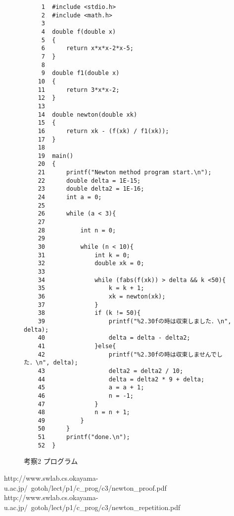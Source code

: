 \documentclass[12pt]{jarticle}
\renewcommand  \[  {\begin{eqnarray}}
\renewcommand  \]  {\end{eqnarray}}
\begin{document}
\begin{figure}[t]
\begin{screen}
\footnotesize
\begin{verbatim}
     1	#include <stdio.h>
     2	#include <math.h> 
     3	
     4	double f(double x)
     5	{
     6	    return x*x*x-2*x-5;
     7	}
     8	
     9	double f1(double x)
    10	{
    11	    return 3*x*x-2;
    12	}
    13	
    14	double newton(double xk)
    15	{
    16	    return xk - (f(xk) / f1(xk));
    17	}
    18	
    19	main()
    20	{
    21	    printf("Newton method program start.\n");
    22	    double delta = 1E-15;
    23	    double delta2 = 1E-16;
    24	    int a = 0;
    25	
    26	    while (a < 3){
    27	
    28	        int n = 0;
    29	
    30	        while (n < 10){
    31	            int k = 0;
    32	            double xk = 0;
    33	
    34	            while (fabs(f(xk)) > delta && k <50){
    35	                k = k + 1;
    36	                xk = newton(xk);
    37	            }
    38	            if (k != 50){
    39	                printf("%2.30fの時は収束しました．\n", delta);
    40	                delta = delta - delta2;
    41	            }else{
    42	                printf("%2.30fの時は収束しませんでした．\n", delta);
    43	                delta2 = delta2 / 10;
    44	                delta = delta2 * 9 + delta;
    45	                a = a + 1;
    46	                n = -1;
    47	            }
    48	            n = n + 1;
    49	        }
    50	    }
    51	    printf("done.\n");
    52	}
\end{verbatim}
\end{screen}
\caption{考察2 プログラム}
\label{fig:4a}
\end{figure}



  http://www.swlab.cs.okayama-u.ac.jp/~gotoh/lect/p1/c\_prog/c3/newton\_proof.pdf
  http://www.swlab.cs.okayama-u.ac.jp/~gotoh/lect/p1/c\_prog/c3/newton\_repetition.pdf
\end{document}
